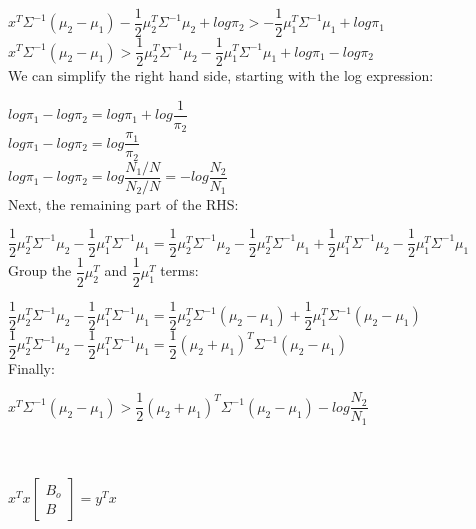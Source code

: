 \documentclass[12pt]{report}
\begin{document}
$x^T \Sigma^{-1} (\mu_2 - \mu_1) - \dfrac{1}{2}\mu_2 ^T \Sigma ^{-1} \mu_2 + log \pi_2  > - \dfrac{1}{2}\mu_1 ^T \Sigma ^{-1} \mu_1 + log \pi_1$\\

$x^T \Sigma^{-1} (\mu_2 - \mu_1) > \dfrac{1}{2}\mu_2 ^T \Sigma ^{-1} \mu_2 - \dfrac{1}{2}\mu_1 ^T \Sigma ^{-1} \mu_1 + log \pi_1 - log \pi_2$ \\


We can simplify the right hand side, starting with the log expression:

$log \pi_1 - log \pi_2 = log \pi_1 + log \dfrac{1}{\pi_2}$\\

$log \pi_1 - log \pi_2 = log \dfrac{\pi_1}{\pi_2}$\\

$log \pi_1 - log \pi_2 = log \dfrac{N_1/N}{N_2/N} = - log \dfrac{N_2}{N_1}$\\

Next, the remaining part of the RHS:

$\dfrac{1}{2}\mu_2 ^T \Sigma ^{-1} \mu_2 - \dfrac{1}{2}\mu_1 ^T \Sigma ^{-1} \mu_1 = \dfrac{1}{2}\mu_2 ^T \Sigma ^{-1} \mu_2 - \dfrac{1}{2}\mu_2 ^T \Sigma ^{-1} \mu_1 + \dfrac{1}{2}\mu_1 ^T \Sigma ^{-1} \mu_2  - \dfrac{1}{2}\mu_1 ^T \Sigma ^{-1} \mu_1$\\

Group the $\dfrac{1}{2}\mu_2 ^T$ and $\dfrac{1}{2}\mu_1 ^T$ terms:

$\dfrac{1}{2}\mu_2 ^T \Sigma ^{-1} \mu_2 - \dfrac{1}{2}\mu_1 ^T \Sigma ^{-1} \mu_1 = \dfrac{1}{2}\mu_2 ^T \Sigma ^{-1} (\mu_2 - \mu_1) +  \dfrac{1}{2}\mu_1 ^T \Sigma ^{-1} (\mu_2 - \mu_1)$\\

$\dfrac{1}{2}\mu_2 ^T \Sigma ^{-1} \mu_2 - \dfrac{1}{2}\mu_1 ^T \Sigma ^{-1} \mu_1 = \dfrac{1}{2}(\mu_2+\mu_1)^T \Sigma ^{-1} (\mu_2 - \mu_1)$\\

Finally:

$x^T \Sigma^{-1} (\mu_2 - \mu_1) > \dfrac{1}{2}(\mu_2+\mu_1)^T \Sigma ^{-1} (\mu_2 - \mu_1)- log \dfrac{N_2}{N_1}$ \\

\hspace{3mm}

\newpage
{}
\\\\
$
x^Tx\begin{bmatrix}
    B_o \\
    B
\end{bmatrix} = y^Tx$
\end{document}
